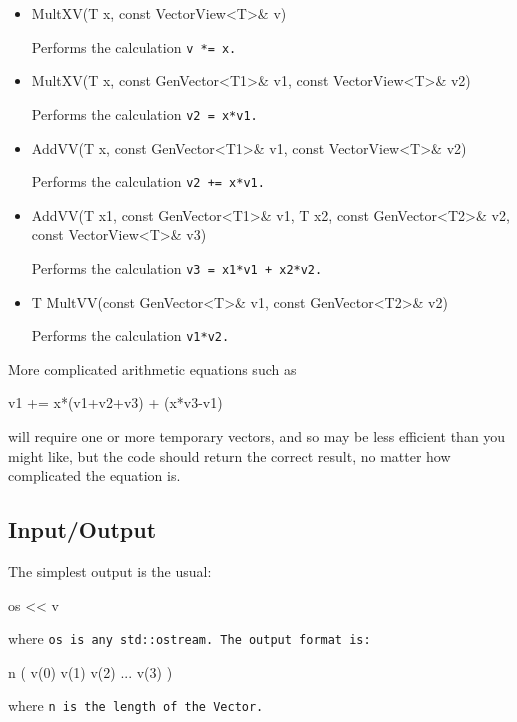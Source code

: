 \begin{itemize}

\item
\begin{tmvcode}
MultXV(T x, const VectorView<T>& v)
\end{tmvcode}
Performs the calculation \tt{v *= x}.

\item
\begin{tmvcode}
MultXV(T x, const GenVector<T1>& v1, const VectorView<T>& v2)
\end{tmvcode}
Performs the calculation \tt{v2 = x*v1}.

\item
\begin{tmvcode}
AddVV(T x, const GenVector<T1>& v1, const VectorView<T>& v2)
\end{tmvcode}
Performs the calculation \tt{v2 += x*v1}.

\item
\begin{tmvcode}
AddVV(T x1, const GenVector<T1>& v1, T x2, const GenVector<T2>& v2,
      const VectorView<T>& v3)
\end{tmvcode}
Performs the calculation \tt{v3 = x1*v1 + x2*v2}.

\item
\begin{tmvcode}
T MultVV(const GenVector<T>& v1, const GenVector<T2>& v2)
\end{tmvcode}
Performs the calculation \tt{v1*v2}.

\end{itemize}

More complicated arithmetic equations such as
\begin{tmvcode}
v1 += x*(v1+v2+v3) + (x*v3-v1) 
\end{tmvcode}
will require one or more temporary vectors, and so may be less efficient than 
you might like, but the code should return the correct result, no matter
how complicated the equation is.

\subsection{Input/Output}
\label{Vector_IO}

The simplest output is the usual:
\begin{tmvcode}
os << v
\end{tmvcode}
where \tt{os} is any \tt{std::ostream}.
The output format is:
\begin{tmvcode}
n ( v(0)  v(1)  v(2)  ...  v(3) )
\end{tmvcode}
where \tt{n} is the length of the \tt{Vector}.

